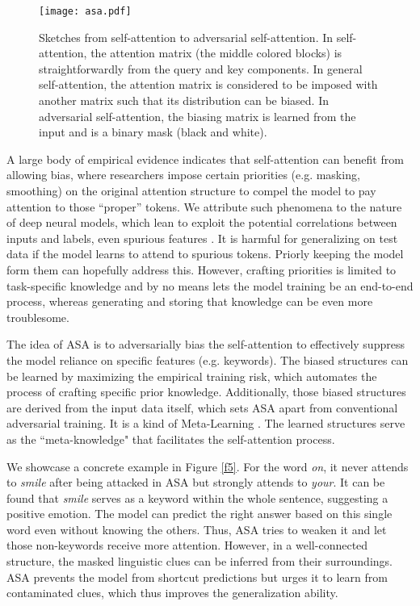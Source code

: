 \documentclass[letterpaper]{article} \usepackage{aaai23}  \usepackage{times}  \usepackage{helvet}  \usepackage{courier}  \usepackage[hyphens]{url}  \usepackage{graphicx} \urlstyle{rm} \def\UrlFont{\rm}  \usepackage{natbib}  \usepackage{caption} \frenchspacing  \setlength{\pdfpagewidth}{8.5in}  \setlength{\pdfpageheight}{11in}  \usepackage{algorithm}
\begin{document}
\begin{figure*}
\centering
\texttt{[image: asa.pdf]}
\caption{Sketches from self-attention to adversarial self-attention. In self-attention, the attention matrix (the middle colored blocks) is straightforwardly from the query and key components. In general self-attention, the attention matrix is considered to be imposed with another matrix such that its distribution can be biased. In adversarial self-attention, the biasing matrix is learned from the input and is a binary mask (black and white).}
\label{f1}
\end{figure*}

A large body of empirical evidence \citep{DBLP:conf/icml/ShiGRXLLK21,DBLP:conf/acl/YouSI20,DBLP:conf/aaai/0001WZDZ020,DBLP:conf/acl/WuZZ21} indicates that self-attention can benefit from allowing bias, where researchers impose certain priorities (e.g. masking, smoothing) on the original attention structure to compel the model to pay attention to those ``proper'' tokens. We attribute such phenomena to the nature of deep neural models, which lean to exploit the potential correlations between inputs and labels, even spurious features \citep{DBLP:conf/icml/SrivastavaHL20}. It is harmful for generalizing on test data if the model learns to attend to spurious tokens. Priorly keeping the model form them can hopefully address this. However, crafting priorities is limited to task-specific knowledge and by no means lets the model training be an end-to-end process, whereas generating and storing that knowledge can be even more troublesome.

The idea of ASA is to adversarially bias the self-attention to effectively suppress the model reliance on specific features (e.g. keywords). The biased structures can be learned by maximizing the empirical training risk, which automates the process of crafting specific prior knowledge. Additionally, those biased structures are derived from the input data itself, which sets ASA apart from conventional adversarial training. It is a kind of Meta-Learning \citep{DBLP:books/sp/98/ThrunP98}. The learned structures serve as the ``meta-knowledge" that facilitates the self-attention process.

We showcase a concrete example in Figure \ref{f5}. For the word \textit{on}, it never attends to \textit{smile} after being attacked in ASA but strongly attends to \textit{your}. It can be found that \textit{smile} serves as a keyword within the whole sentence, suggesting a positive emotion. The model can predict the right answer based on this single word even without knowing the others. Thus, ASA tries to weaken it and let those non-keywords receive more attention. However, in a well-connected structure, the masked linguistic clues can be inferred from their surroundings. ASA prevents the model from shortcut predictions but urges it to learn from contaminated clues, which thus improves the generalization ability.
\end{document}
